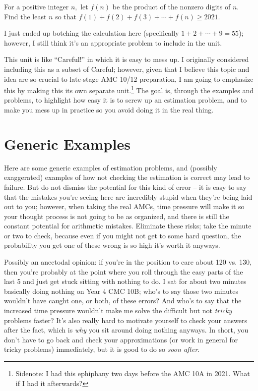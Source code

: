 \documentclass[mast]{lucky}
\begin{document}
\begin{exer}[CMC 10B 2021/18]
For a positive integer $n,$ let $f(n)$ be the product of the nonzero digits of $n.$ Find the least $n$ so that $f(1)+f(2)+f(3)+\cdots+f(n)\geq 2021.$

\end{exer}

I just ended up botching the calculation here (specifically $1+2+\cdots+9=55$); however, I still think it's an appropriate problem to include in the unit.

This unit is like ``Careful!'' in which it is easy to mess up. I originally considered including this as a subset of Careful; however, given that I believe this topic and idea are so crucial to late-stage AMC 10/12 preparation, I am going to emphasize this by making this its own separate unit.\footnote{Sidenote: I had this ephiphany two days before the AMC 10A in 2021. What if I had it afterwards?} The goal is, through the examples and problems, to highlight how easy it is to screw up an estimation problem, and to make you mess up in practice so you avoid doing it in the real thing.

\section{Generic Examples}

Here are some generic examples of estimation problems, and (possibly exaggerated) examples of how not checking the estimation is correct may lead to failure. But do not dismiss the potential for this kind of error -- it is easy to say that the mistakes you're seeing here are incredibly stupid when they're being laid out to you; however, when taking the real AMCs, time pressure will make it so your thought process is not going to be as organized, and there is still the constant potential for arithmetic mistakes. Eliminate these risks; take the minute or two to check, because even if you might not get to some hard question, the probability you get one of these wrong is so high it's worth it anyways.

\begin{remark}
Possibly an anectodal opinion: if you're in the position to care about 120 vs. 130, then you're probably at the point where you roll through the easy parts of the last 5 and just get stuck sitting with nothing to do. I sat for about two minutes basically doing nothing on Year 4 CMC 10B; who's to say those two minutes wouldn't have caught one, or both, of these errors? And who's to say that the increased time pressure wouldn't make me solve the difficult but not \textit{tricky} problems faster? It's also really hard to motivate yourself to check your answers after the fact, which is \textit{why} you sit around doing nothing anyways. In short, you don't have to go back and check your approximations (or work in general for tricky problems) immediately, but it is good to do so \textit{soon after}.
\end{remark}
\end{document}
